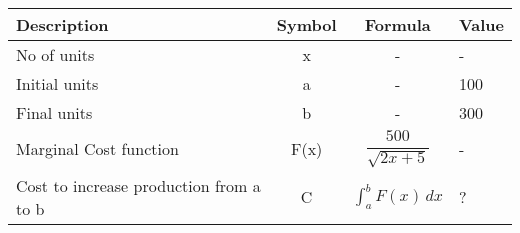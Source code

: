 \begin{center}
    \begin{tabular}{|p{2.5cm}|c|c|p{1.5cm}|}
     \hline
     \textbf{Description}  & \textbf{Symbol} &  \textbf{Formula}  &  \textbf{Value}\\
       \hline
       \hline
       No of units & x & - & - \\
       \hline
       Initial units & a & - & 100 \\
       \hline
       Final units & b & - & 300 \\
       \hline
       Marginal Cost function & F(x) & $\dfrac{500}{\sqrt{2x+5}}$ & - \\
       \hline
       Cost to increase production from a to b & C & \(\int_{a}^{b} F(x) \,dx\) & ? \\
       \hline
       \end{tabular}
\end{center}
